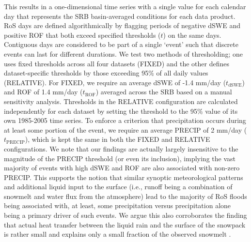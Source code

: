 \documentclass[nhess, manuscript]{copernicus}
\begin{document}
This results in a one-dimensional time series with a single value for each calendar day that represents the SRB basin-averaged conditions for each data product.
RoS days are defined algorithmically by flagging periods of negative dSWE and positive ROF that both exceed specified thresholds ($t$) on the same days.
Contiguous days are considered to be part of a single `event' such that discrete events can last for different durations.
We test two methods of thresholding; one uses fixed thresholds across all four datasets (FIXED) and the other defines dataset-specific thresholds by those exceeding 95\% of all daily values (RELATIVE).
For FIXED, we require an average dSWE of -1.4 mm/day ($t_{\textrm{dSWE}}$) and ROF of 1.4 mm/day ($t_{\textrm{ROF}}$) averaged across the SRB based on a manual sensitivity analysis.
Thresholds in the RELATIVE configuration are calculated independently for each dataset by setting the threshold to the 95\% value of its own 1985-2005 time series.
To enforce a criterion that precipitation occurs during at least some portion of the event, we require an average PRECIP of 2 mm/day ($t_{\textrm{PRECIP}}$), which is kept the same in both the FIXED and RELATIVE configurations. We note that our findings are actually largely insensitive to the magnitude of the PRECIP threshold (or even its inclusion), implying the vast majority of events with high dSWE and ROF are also associated with non-zero PRECIP.
This supports the notion that similar synoptic meteorological patterns \citep{grote2021synoptic} and additional liquid input to the surface (i.e., runoff being a combination of snowmelt and water flux from the atmosphere) lead to the majority of RoS floods being associated with, at least, some precipitation versus precipitation alone being a primary driver of such events.
We argue this also corroborates the finding that actual heat transfer between the liquid rain and the surface of the snowpack is rather small and explains only a small fraction of the observed snowmelt \citep{moore1984controls}.
\end{document}
